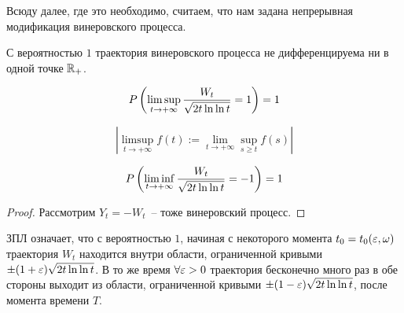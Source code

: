 \begin{remark}
Всюду далее, где это необходимо, считаем, что нам задана непрерывная модификация винеровского
процесса.
\end{remark}

\begin{theorem}
С вероятностью $1$ траектория винеровского процесса не дифференцируема ни в одной точке $\mathbb{R}_+$.
\end{theorem}
\begin{theorem}
$$P \left(  \limsup_{t \to +\infty} \frac{W_t}{\sqrt{2t \ln \ln t}} = 1  \right) = 1$$

$$ \left| \limsup_{t \to +\infty} f(t) := \lim_{t\to +\infty} \sup_{s \geq t} f(s) \right| $$
\end{theorem}
\begin{corollary}
$$P \left(  \liminf_{t \to +\infty} \frac{W_t}{\sqrt{2t \ln \ln t}} = -1  \right) = 1$$
\end{corollary}
\begin{proof}
Рассмотрим $Y_t = -W_t$~-- тоже винеровский процесс.
\end{proof}

ЗПЛ означает, что с вероятностью $1$, начиная с некоторого момента $t_0 = t_0(\varepsilon, \omega)$
траектория $W_t$ находится внутри области, ограниченной кривыми $\pm (1+\varepsilon)\sqrt{2t\ln\ln t}$.
В то же время $\forall \varepsilon > 0$ траектория бесконечно много раз в обе стороны выходит из области,
ограниченной кривыми $\pm (1-\varepsilon)\sqrt{2t\ln\ln t}$, после момента времени $T$.

